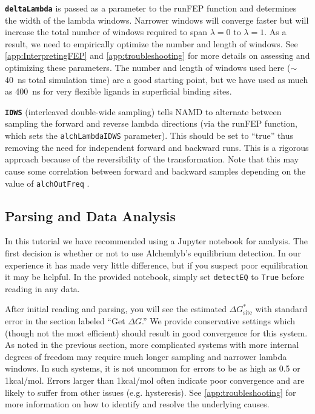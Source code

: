 \documentclass[9pt,tutorial]{Styling/livecoms}
\newcommand{\textInput}[1]{
  \texttt{#1}
}
\begin{document}
\textbf{\textInput{deltaLambda}} is passed as a parameter to the runFEP function and determines the width of the lambda windows. Narrower windows will converge faster but will increase the total number of windows required to span $\lambda=0$ to $\lambda=1$. 
As a result, we need to empirically optimize the number and length of windows. 
See \ref{app:InterpretingFEP} and \ref{app:troubleshooting} for more details on assessing and optimizing these parameters. 
The number and length of windows used here ($\sim$ 40~ns total simulation time) are a good starting point, but we have used as much as 400~ns for very flexible ligands in superficial binding sites\cite{Petroff2022}.

\textbf{\textInput{IDWS}} (interleaved double-wide sampling) 
tells NAMD to alternate between sampling the forward and reverse lambda directions (via the runFEP function, which sets the \textInput{alchLambdaIDWS} parameter). This should be set to ``true'' thus removing the need for independent forward and backward runs. This is a rigorous approach because of the reversibility of the transformation. Note that this may cause some correlation between forward and backward samples depending on the value of \textInput{alchOutFreq}.

\subsection{Parsing and Data Analysis}\label{app:Analysis}
In this tutorial we have recommended using a Jupyter notebook for analysis. The first decision is whether or not to use Alchemlyb's equilibrium detection. In our experience it has made very little difference, but if you suspect poor equilibration it may be helpful. In the provided notebook, simply set \textInput{detectEQ} to \textInput{True} before reading in any data.

After initial reading and parsing, you will see the estimated $\Delta G_\mathrm{site}^*$ with standard error in the section labeled ``Get $\Delta G$.'' We provide conservative settings which (though not the most efficient) should result in good convergence for this system. As noted in the previous section, more complicated systems with more internal degrees of freedom may require much longer sampling and narrower lambda windows. In such systems, it is not uncommon for errors to be as high as 0.5 or 1kcal/mol. Errors larger than 1kcal/mol often indicate poor convergence and are likely to suffer from other issues (e.g. hysteresis). See \ref{app:troubleshooting} for more information on how to identify and resolve the underlying causes.
\end{document}
